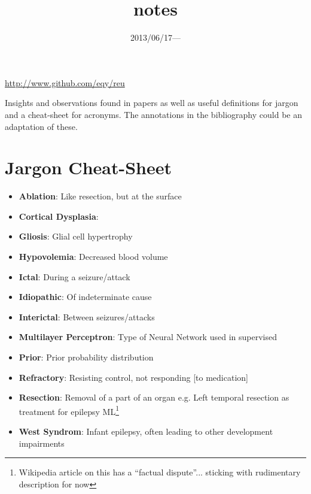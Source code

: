 \documentclass{article}
\title{\vspace{-3ex}notes}
\date{2013/06/17---}
\begin{document}
    \maketitle
    \url{http://www.github.com/eqy/reu}

    Insights and observations found in papers as well as useful definitions for
    jargon and a cheat-sheet for acronyms. The annotations in the bibliography 
could be an adaptation of these.

    \section{Jargon Cheat-Sheet}
        \begin{itemize}
            \item \textbf{Ablation}: Like resection, but at the surface
            \item \textbf{Cortical Dysplasia}: \item \textbf{Gliosis}: Glial 
cell hypertrophy
            \item \textbf{Hypovolemia}: Decreased blood volume
            \item \textbf{Ictal}: During a seizure/attack
            \item \textbf{Idiopathic}: Of indeterminate cause
            \item \textbf{Interictal}: Between seizures/attacks
            \item \textbf{Multilayer Perceptron}: Type of Neural Network used in 
supervised
            \item \textbf{Prior}: Prior probability distribution
            \item \textbf{Refractory}: Resisting control, not responding [to 
medication] \item \textbf{Resection}: Removal of a part of an organ e.g. Left 
temporal
            resection as treatment for epilepsy
            ML\footnote{Wikipedia article on this has a ``factual dispute''...  
sticking with
            rudimentary description for now}
            \item \textbf{West Syndrom}: Infant epilepsy, often leading to other 
development
            impairments
        \end{itemize}
\end{document}
